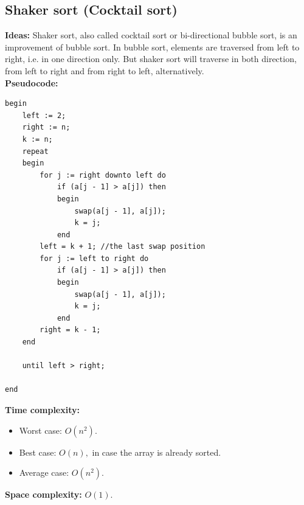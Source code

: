 \documentclass[12pt,a4paper]{article}
\begin{document}
\subsection{Shaker sort (Cocktail sort)}
\label{shakersort}
\textbf{Ideas:} 
Shaker sort, also called cocktail sort or bi-directional bubble sort, is an improvement of bubble sort. In bubble sort, elements are traversed from left to right, i.e. in one direction only. But shaker sort will traverse in both direction, from left to right and from right to left, alternatively. \cite{shaker}\\
\textbf{Pseudocode:} \cite{thayP}
\lstset{language=Pascal} 
\begin{lstlisting}[caption = {Shaker sort}]
begin
	left := 2;
	right := n;
	k := n;
	repeat
	begin
		for j := right downto left do
			if (a[j - 1] > a[j]) then
			begin
				swap(a[j - 1], a[j]);
				k = j;
			end
		left = k + 1; //the last swap position
		for j := left to right do
			if (a[j - 1] > a[j]) then
			begin
				swap(a[j - 1], a[j]);
				k = j;
			end
		right = k - 1;
	end 
	
	until left > right;
	
end
\end{lstlisting}
\textbf{Time complexity:} \cite{shaksort}
\begin{itemize}
\item Worst case: $O \left( {n^2} \right).$
\item Best case: $O \left( {n} \right),$ in case the array is already sorted.
\item Average case: $O \left( {n^2} \right).$
\end{itemize}
\textbf{Space complexity:} $O \left( {1} \right).$ \cite{shaksort}
\end{document}
